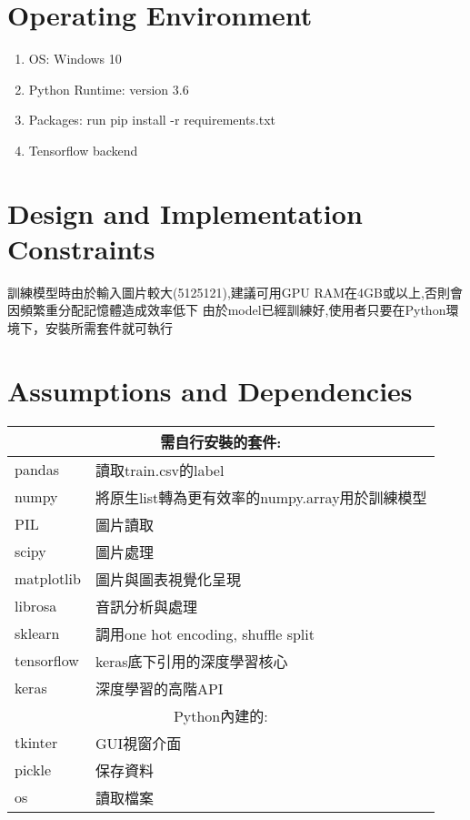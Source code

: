 \documentclass{scrreprt}
\begin{document}
\begin{CJK*}{UTF8}{bsmi}
\section{Operating Environment}
\begin{enumerate}
\item OS: Windows 10
\item Python Runtime: version 3.6
\item Packages: run pip install -r requirements.txt
\item Tensorflow backend
\end{enumerate}

\section{Design and Implementation Constraints}
訓練模型時由於輸入圖片較大(5125121),建議可用GPU RAM在4GB或以上,否則會因頻繁重分配記憶體造成效率低下 由於model已經訓練好,使用者只要在Python環境下，安裝所需套件就可執行

\section{Assumptions and Dependencies}

\begin{center}
\begin{tabular}{|l|l|}
\hline \multicolumn{2}{|c|}{需自行安裝的套件:} \\\hline
pandas  & 讀取train.csv的label  \\ \hline
numpy  & 將原生list轉為更有效率的numpy.array用於訓練模型  \\ \hline
PIL  & 圖片讀取  \\\hline
scipy & 圖片處理 \\\hline
matplotlib  & 圖片與圖表視覺化呈現  \\\hline
librosa  & 音訊分析與處理  \\\hline
sklearn  & 調用one hot encoding, shuffle split  \\\hline
tensorflow  & keras底下引用的深度學習核心  \\\hline
keras  & 深度學習的高階API  \\
\hline \multicolumn{2}{|c|}{Python內建的:} \\\hline
tkinter       & GUI視窗介面  \\ \hline
pickle        & 保存資料  \\ \hline
os  & 讀取檔案  \\\hline


\end{tabular}
\end{center}
\end{CJK*}
\end{document}
